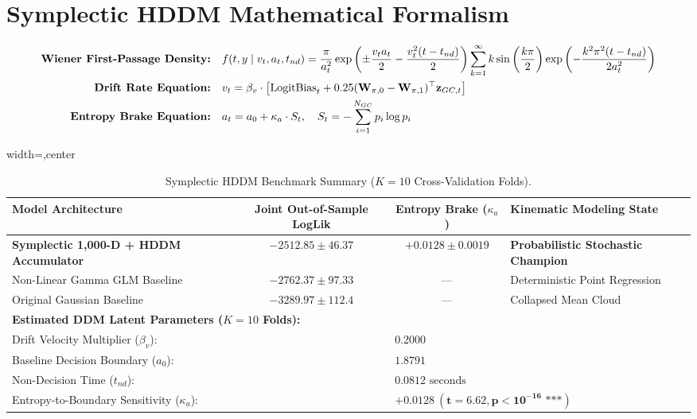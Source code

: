 \documentclass[11pt,twoside,a4paper]{article}
\begin{document}
\section{Symplectic HDDM Mathematical Formalism}

\begin{align}
\text{\textbf{Wiener First-Passage Density:}} \quad &f(t, y \mid v_t, a_t, t_{nd}) = \frac{\pi}{a_t^2} \exp\left( \pm \frac{v_t a_t}{2} - \frac{v_t^2 (t - t_{nd})}{2} \right) \sum_{k=1}^\infty k \sin\left(\frac{k\pi}{2}\right) \exp\left( -\frac{k^2 \pi^2 (t - t_{nd})}{2 a_t^2} \right) \\
\text{\textbf{Drift Rate Equation:}} \quad &v_t = \beta_v \cdot \left[ \text{LogitBias}_t + 0.25 (\mathbf{W}_{\pi, 0} - \mathbf{W}_{\pi, 1})^\top \mathbf{z}_{GC, t} \right] \\
\text{\textbf{Entropy Brake Equation:}} \quad &a_t = a_0 + \kappa_a \cdot S_t, \quad S_t = -\sum_{i=1}^{N_{GC}} p_i \log p_i
\end{align}

\begin{table}[H]
\centering
\caption{Symplectic HDDM Benchmark Summary ($K=10$ Cross-Validation Folds).}
\label{tab:hddm_summary}
\vspace{0.4em}
\begin{adjustbox}{width=\textwidth,center}
\begin{tabular}{l c c l}
\toprule
\textbf{Model Architecture} & \textbf{Joint Out-of-Sample LogLik} & \textbf{Entropy Brake ($\kappa_a$)} & \textbf{Kinematic Modeling State} \\
\midrule
\textbf{Symplectic 1,000-D + HDDM Accumulator} & $\mathbf{-2512.85 \pm 46.37}$ & $\mathbf{+0.0128 \pm 0.0019}$ & \textbf{Probabilistic Stochastic Champion} \\
Non-Linear Gamma GLM Baseline & $-2762.37 \pm 97.33$ & --- & Deterministic Point Regression \\
Original Gaussian Baseline & $-3289.97 \pm 112.4$ & --- & Collapsed Mean Cloud \\
\midrule
\multicolumn{4}{l}{\textbf{Estimated DDM Latent Parameters ($K=10$ Folds):}} \\
\multicolumn{2}{l}{Drift Velocity Multiplier ($\beta_v$):} & \multicolumn{2}{l}{$0.2000$} \\
\multicolumn{2}{l}{Baseline Decision Boundary ($a_0$):} & \multicolumn{2}{l}{$1.8791$} \\
\multicolumn{2}{l}{Non-Decision Time ($t_{nd}$):} & \multicolumn{2}{l}{$0.0812\text{ seconds}$} \\
\multicolumn{2}{l}{Entropy-to-Boundary Sensitivity ($\kappa_a$):} & \multicolumn{2}{l}{$\mathbf{+0.0128 \ (t = 6.62, p < 10^{-16} \text{ ***})}$} \\
\bottomrule
\end{tabular}
\end{adjustbox}
\end{table}
\end{document}
